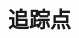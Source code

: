 \documentclass[class=book, crop=false]{standalone}
\begin{document}
\begin{CJK}{UTF8}{gbsn}

\chapter{追踪点}











\cleardoublepage

\end{CJK}
\end{document}
